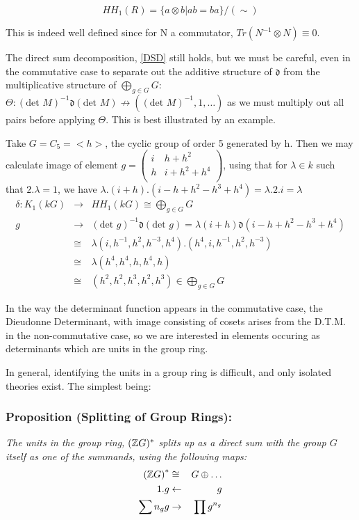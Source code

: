 $$HH_1(R) = \{a\otimes b| ab=ba\}/(\sim)$$

This is indeed well defined since for N a commutator, $Tr(N^{-1}\otimes N) \equiv 0$.

The direct sum decomposition, \ref{DSD} still holds, but we must be careful, even in the commutative case to separate out the additive structure of $\mathfrak d$ from the multiplicative structure of $\bigoplus_{g\in G} G$: $\Theta: (\text{det }M)^{-1}\mathfrak d (\text{det } M) \nrightarrow ((\text{det }M)^{-1}, 1, \dots)$ as we must multiply out all pairs before applying $\Theta$. This is best illustrated by an example.

Take $G=C_5 = <h>$, the cyclic group of order 5 generated by h. Then we may calculate image of element $g= \left (\begin{array}{cc}
i& h+h^2\\
h & i+h^2+h^4\\
\end{array}\right )$, using that for $\lambda\in k$ such that $2.\lambda = 1$, we have $\lambda.(i+h).(i-h+h^2-h^3+h^4) = \lambda.2.i = \lambda$
\begin{eqnarray}
\nonumber \delta: K_1(kG) &\rightarrow& HH_1(kG) \cong \bigoplus_{g\in G}G\\
\nonumber             g              &\rightarrow& (\text{det }g)^{-1}\mathfrak d (\text{det }g) = \lambda(i+h)\mathfrak d (i-h+h^2-h^3+h^4)\\
\nonumber                              &\cong& \lambda(i,h^{-1},h^2,h^{-3},h^4).(h^4,i,h^{-1},h^2,h^{-3})\\
\nonumber			   &\cong& \lambda (h^4,h^4,h,h^4,h)\\
\nonumber 			   &\cong& (h^2,h^2,h^3,h^2,h^3) \in \bigoplus_{g\in G} G
\end{eqnarray}

In the way the determinant function appears in the commutative case, the Dieudonne Determinant, with image consisting of cosets arises from the D.T.M. in the non-commutative case, so we are interested in elements occuring as determinants which are units in the group ring.

In general, identifying the units in a group ring is difficult, and only isolated theories exist. The simplest being:
\subsubsection{Proposition (Splitting of Group Rings):}

\emph{The units in the group ring, $(\mathbb Z G )^*$ splits up as a direct sum with the group $G$ itself as one of the summands, using the following maps:
\begin{eqnarray}
\nonumber  {( \mathbb ZG)}^{*}&\cong&G\oplus\dots\\
\nonumber        1.g  &\leftarrow& g\\
\nonumber   \sum n_g g &\rightarrow& \prod g^{n_g}
\end{eqnarray}}

